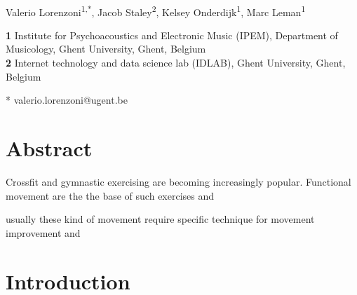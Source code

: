 \documentclass[10pt,letterpaper]{article}
\date{}
\begin{document}
\vspace*{0.35in}

\begin{flushleft}
{\Large
\textbf{}
}
\newline
\\
Valerio Lorenzoni\textsuperscript{1,*},
Jacob Staley\textsuperscript{2},
Kelsey Onderdijk\textsuperscript{1},
Marc Leman\textsuperscript{1}

\bigskip

\textbf{1} Institute for Psychoacoustics and Electronic Music (IPEM), Department of Musicology, Ghent University, Ghent, Belgium
\\
\textbf{2}  Internet technology and data science lab (IDLAB), Ghent University, Ghent, Belgium
\\

\bigskip



* valerio.lorenzoni@ugent.be

\end{flushleft}

\section*{Abstract}

Crossfit and gymnastic exercising are becoming increasingly popular. Functional movement are the the base of such exercises and 

usually these kind of movement require specific technique for movement improvement and 


\section*{Introduction}
\end{document}
